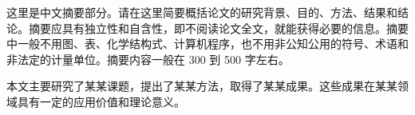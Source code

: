 
\begin{cnabstract}
这里是中文摘要部分。请在这里简要概括论文的研究背景、目的、方法、结果和结论。摘要应具有独立性和自含性，即不阅读论文全文，就能获得必要的信息。摘要中一般不用图、表、化学结构式、计算机程序，也不用非公知公用的符号、术语和非法定的计量单位。摘要内容一般在 300 到 500 字左右。

本文主要研究了某某课题，提出了某某方法，取得了某某成果。这些成果在某某领域具有一定的应用价值和理论意义。

\end{cnabstract}
